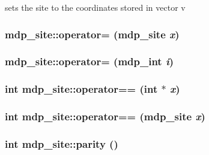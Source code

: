 sets the site to the coordinates stored in vector v \hypertarget{classmdp__site_aee55a3c862cb667839be5febd37b1791}{
\subsubsection[{operator=}]{ mdp\_\-site::operator= ({\bf mdp\_\-site} {\em x})}}
\label{classmdp__site_aee55a3c862cb667839be5febd37b1791}
\hypertarget{classmdp__site_ab54108d3429bf4edb3d2434545a425c2}{
\subsubsection[{operator=}]{ mdp\_\-site::operator= ({\bf mdp\_\-int} {\em i})}}
\label{classmdp__site_ab54108d3429bf4edb3d2434545a425c2}
\hypertarget{classmdp__site_af311165eb929fe7cf2957742009590b9}{
\subsubsection[{operator==}]{\setlength{\rightskip}{0pt plus 5cm}int mdp\_\-site::operator== (int $\ast$ {\em x})}}
\label{classmdp__site_af311165eb929fe7cf2957742009590b9}
\hypertarget{classmdp__site_a171afa9aeee40776c4ee8405fba525aa}{
\subsubsection[{operator==}]{\setlength{\rightskip}{0pt plus 5cm}int mdp\_\-site::operator== ({\bf mdp\_\-site} {\em x})}}
\label{classmdp__site_a171afa9aeee40776c4ee8405fba525aa}
\hypertarget{classmdp__site_a0b36dc1179dac2b0737dda900f135194}{
\subsubsection[{parity}]{\setlength{\rightskip}{0pt plus 5cm}int mdp\_\-site::parity ()}}
\label{classmdp__site_a0b36dc1179dac2b0737dda900f135194}


